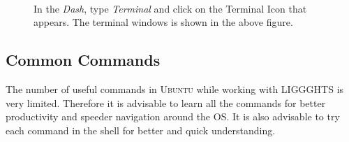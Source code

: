 \documentclass{tufte-book} %
\begin{document}
\begin{figure}[p]
\\\vspace{\baselineskip}
\caption{In the \emph{Dash}, type \emph{Terminal} and click on the Terminal Icon that appears. The terminal windows is shown in the above figure.}
\end{figure}





\subsection{Common Commands}

\begin{fullwidth}
  The number of useful commands in \textsc{Ubuntu} while working with LIGGGHTS is very limited. Therefore it is advisable to learn all the commands for better productivity and speeder navigation around the OS. It is also advisable to try each command in the shell for better and quick understanding. 
\end{fullwidth}
\end{document}
